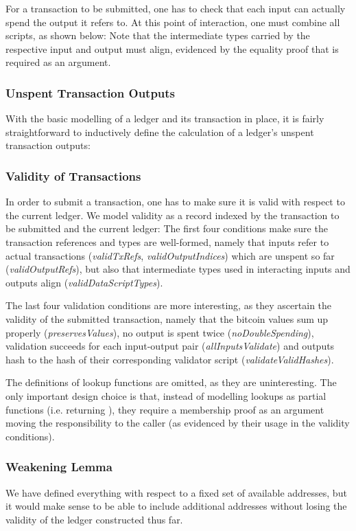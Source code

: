 \documentclass[acmsmall,nonacm=true,screen=true]{acmart}
\begin{document}
For a transaction to be submitted, one has to check that each input can actually spend the output it refers to.
At this point of interaction, one must combine all scripts, as shown below:
\UTXOrunValidation{}
Note that the intermediate types carried by the respective input and output must align, evidenced by the
equality proof that is required as an argument.

\subsubsection{Unspent Τransaction Οutputs}
With the basic modelling of a ledger and its transaction in place, it is fairly straightforward to 
inductively define the calculation of a ledger's unspent transaction outputs:
\UTXOutxo{}

\subsubsection{Validity of Τransactions}
In order to submit a transaction, one has to make sure it is valid with respect to the current ledger.
We model validity as a record indexed by the transaction to be submitted and the current ledger:
\UTXOvalidA{}
\UTXOvalidB{}
The first four conditions make sure the transaction references and types are well-formed, namely that
inputs refer to actual transactions (\textit{validTxRefs}, \textit{validOutputIndices})
which are unspent so far (\textit{validOutputRefs}), but also that intermediate types used in interacting
inputs and outputs align (\textit{validDataScriptTypes}).

The last four validation conditions are more interesting, as they ascertain the validity of the submitted transaction,
namely that the bitcoin values sum up properly (\textit{preservesValues}), no output is spent twice (\textit{noDoubleSpending}),
validation succeeds for each input-output pair (\textit{allInputsValidate}) and outputs hash to the hash of their corresponding 
validator script (\textit{validateValidHashes}).

The definitions of lookup functions are omitted, as they are uninteresting. The only important design choice is that,
instead of modelling lookups as partial functions (i.e. returning \inlineMaybe{}), they require a membership
proof as an argument moving the responsibility to the caller (as evidenced by their usage in the validity conditions).

\subsubsection{Weakening Lemma}
We have defined everything with respect to a fixed set of available addresses, but it would make sense to be able to include
additional addresses without losing the validity of the ledger constructed thus far.
\end{document}
